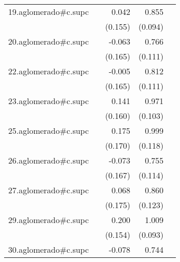 {\begin{longtable}{l*{4}{D{.}{.}{-1}}}
\addlinespace
19.aglomerado#c.supc&                     &       0.042         &       0.855\sym{***}&                     \\
            &                     &     (0.155)         &     (0.094)         &                     \\
\addlinespace
20.aglomerado#c.supc&                     &      -0.063         &       0.766\sym{***}&                     \\
            &                     &     (0.165)         &     (0.111)         &                     \\
\addlinespace
22.aglomerado#c.supc&                     &      -0.005         &       0.812\sym{***}&                     \\
            &                     &     (0.165)         &     (0.111)         &                     \\
\addlinespace
23.aglomerado#c.supc&                     &       0.141         &       0.971\sym{***}&                     \\
            &                     &     (0.160)         &     (0.103)         &                     \\
\addlinespace
25.aglomerado#c.supc&                     &       0.175         &       0.999\sym{***}&                     \\
            &                     &     (0.170)         &     (0.118)         &                     \\
\addlinespace
26.aglomerado#c.supc&                     &      -0.073         &       0.755\sym{***}&                     \\
            &                     &     (0.167)         &     (0.114)         &                     \\
\addlinespace
27.aglomerado#c.supc&                     &       0.068         &       0.860\sym{***}&                     \\
            &                     &     (0.175)         &     (0.123)         &                     \\
\addlinespace
29.aglomerado#c.supc&                     &       0.200         &       1.009\sym{***}&                     \\
            &                     &     (0.154)         &     (0.093)         &                     \\
\addlinespace
30.aglomerado#c.supc&                     &      -0.078         &       0.744\sym{***}&                     \\

\end{longtable}}
